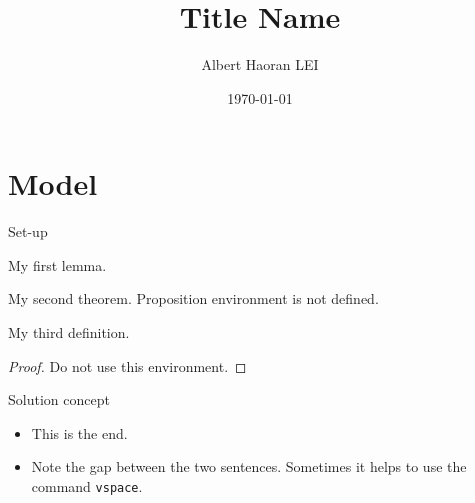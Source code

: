 \documentclass{beamer}
\begin{document}
\title{Title Name}
\author{Albert Haoran LEI}
\date{\today}


\begin{frame}
  \titlepage
\end{frame}

\section{Model}

\begin{frame}{Set-up}
    \begin{lemma}
        My first lemma.
    \end{lemma}
    
    \begin{theorem}
        My second theorem. Proposition environment is not defined.
    \end{theorem}
    
    \begin{definition}
        My third definition.
    \end{definition}
    
    \begin{proof}
        Do not use this environment. 
    \end{proof}
\end{frame}


\begin{frame}{Solution concept}
\begin{itemize}
    \item This is the end.
    
    \vspace{0.4cm}
    
    \item Note the gap between the two sentences. Sometimes it helps to use the command \texttt{vspace}. 
\end{itemize}
\end{frame}
\end{document}
